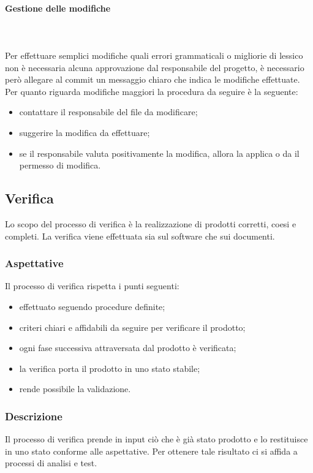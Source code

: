 	\paragraph{Gestione delle modifiche} \mbox{}\\ \mbox{}\\
	Per effettuare semplici modifiche quali errori grammaticali o migliorie di lessico non è necessaria alcuna approvazione dal responsabile del progetto, è necessario però allegare al commit un messaggio chiaro che indica le modifiche effettuate.
	Per quanto riguarda modifiche maggiori la procedura da seguire è la seguente:
	\begin{itemize}
		\item contattare il responsabile del file da modificare;
		\item suggerire la modifica da effettuare;
		\item se il responsabile valuta positivamente la modifica, allora la applica o da il permesso di modifica.
	\end{itemize}
		
\subsection{Verifica}
	Lo scopo del processo di verifica è la realizzazione di prodotti corretti, coesi e completi. La verifica viene effettuata sia sul software che sui documenti. 
	\subsubsection{Aspettative}
	Il processo di verifica rispetta i punti seguenti:	
	\begin{itemize}
		\item effettuato seguendo procedure definite;
		\item criteri chiari e affidabili da seguire per verificare il prodotto;
		\item ogni fase successiva attraversata dal prodotto è verificata;
		\item la verifica porta il prodotto in uno stato stabile;
		\item rende possibile la validazione.
	\end{itemize}
	\subsubsection{Descrizione}
	Il processo di verifica prende in input ciò che è già stato prodotto e lo restituisce in uno stato conforme alle aspettative. Per ottenere tale risultato ci si affida a processi di analisi e test.

